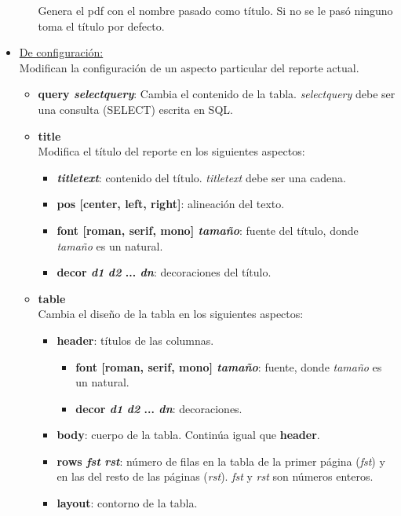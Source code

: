 \documentclass[a4paper,12pt]{article}
\begin{document}
\begin{itemize}
\begin{itemize}
		Genera el pdf con el nombre pasado como título. Si no se le pasó ninguno toma el título por defecto. %
		\end{itemize} 
	\item \underline{De configuración:}\\
	Modifican la configuración de un aspecto particular del reporte actual.
		\begin{itemize}
		\item \textbf{query \textit{selectquery}}: Cambia el contenido de la tabla. \textit{selectquery} debe ser una consulta (SELECT) escrita en SQL.
		\item \textbf{title}\\
		Modifica el título del reporte en los siguientes aspectos:
			\begin{itemize}
			\item \textbf{\textit{titletext}}: contenido del título. \textit{titletext} debe ser una cadena.
			\item \textbf{pos [center, left, right]}: alineación del texto.
			\item \textbf{font [roman, serif, mono] \textit{tamaño}}: fuente del título, donde \textit{tamaño} es un natural.
			\item \textbf{decor \textit{d1} \textit{d2} ... \textit{d{n}}}: decoraciones del título.
			\end{itemize}
		\item \textbf{table}\\
		Cambia el diseño de la tabla en los siguientes aspectos:
			\begin{itemize}
			\item \textbf{header}: títulos de las columnas.
				\begin{itemize}
					\item \textbf{font [roman, serif, mono] \textit{tamaño}}: fuente, donde \textit{tamaño} es un natural.
					\item \textbf{decor \textit{d1} \textit{d2} ... \textit{d{n}}}: decoraciones.
				\end{itemize}
			\item \textbf{body}: cuerpo de la tabla. Continúa igual que \textbf{header}.
			\item \textbf{rows \textit{fst} \textit{rst}}: número de filas en la tabla de la primer página (\textit{fst}) y en las del resto de las páginas (\textit{rst}). \textit{fst} y \textit{rst} son números enteros.
			\item \textbf{layout}: contorno de la tabla.
				\begin{itemize}

\end{itemize}
\end{itemize}
\end{itemize}
\end{itemize}
\end{document}
